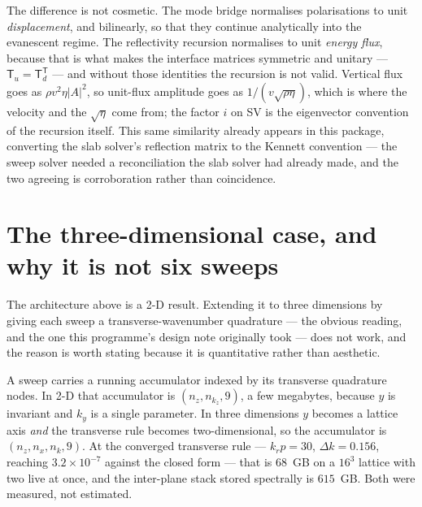 \documentclass[11pt,a4paper]{article}
\begin{document}
The difference is not cosmetic. The mode bridge normalises polarisations to unit
\emph{displacement}, and bilinearly, so that they continue analytically into the evanescent
regime. The reflectivity recursion normalises to unit \emph{energy flux}, because that is what
makes the interface matrices symmetric and unitary --- $\mathsf{T}_u = \mathsf{T}_d^{\mathsf T}$
--- and without those identities the recursion is not valid. Vertical flux goes as
$\rho v^2 \eta |A|^2$, so unit-flux amplitude goes as $1/(v\sqrt{\rho\eta})$, which is where the
velocity and the $\sqrt{\eta}$ come from; the factor $i$ on SV is the eigenvector convention of
the recursion itself. This same similarity already appears in this package, converting the slab
solver's reflection matrix to the Kennett convention --- the sweep solver needed a reconciliation
the slab solver had already made, and the two agreeing is corroboration rather than coincidence.

\section{The three-dimensional case, and why it is not six sweeps}\label{sec:threed}

The architecture above is a 2\textonehalf-D result. Extending it to three dimensions by giving
each sweep a transverse-wavenumber quadrature --- the obvious reading, and the one this
programme's design note originally took --- does not work, and the reason is worth stating
because it is quantitative rather than aesthetic.

A sweep carries a running accumulator indexed by its transverse quadrature nodes. In
2\textonehalf-D that accumulator is $(n_z, n_{k_z}, 9)$, a few megabytes, because $y$ is
invariant and $k_y$ is a single parameter. In three dimensions $y$ becomes a lattice axis
\emph{and} the transverse rule becomes two-dimensional, so the accumulator is
$(n_z, n_x, n_k, 9)$. At the converged transverse rule --- $k_r p = 30$, $\Delta k = 0.156$,
reaching $3.2\times10^{-7}$ against the closed form --- that is $68$~GB on a $16^3$ lattice with
two live at once, and the inter-plane stack stored spectrally is $615$~GB. Both were measured,
not estimated.
\end{document}

